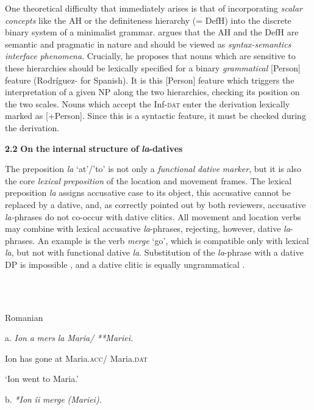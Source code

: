 \documentclass[output=paper,modfonts,nonflat]{langsci/langscibook}
\begin{document}
One theoretical difficulty that immediately arises is that of incorporating \textit{scalar} \textit{concepts} like the AH or the definiteness hierarchy (= DefH) into the discrete binary system of a minimalist grammar. \citet{Richards2008} argues that the AH and the DefH are semantic and pragmatic in nature and should be viewed as \textit{syntax-semantics} \textit{interface} \textit{phenomena}. Crucially, he proposes that nouns which are sensitive to these hierarchies should be lexically specified for a binary \textit{grammatical} [Person] feature (Rodríguez-\citealt{Mondoñedo2007} for Spanish). It is this [Person] feature which triggers the interpretation of a given NP along the two hierarchies, checking its position on the two scales. Nouns which accept the Inf-\textsc{dat} enter the derivation lexically marked as [+Person]. Since this is a syntactic feature, it must be checked during the derivation. 

\textbf{2.2} \textbf{On} \textbf{the} \textbf{internal} \textbf{structure} \textbf{of} \textbf{\textit{la}}\textbf{{}-datives}

The preposition \textit{la} ‘at’/’to’ is not only a \textit{functional} \textit{dative} \textit{marker}, but it is also the core \textit{lexical} \textit{preposition} of the location and movement frames. The lexical preposition \textit{la} assigns accusative case to its object, this accusative cannot be replaced by a dative, and, as correctly pointed out by both reviewers, accusative \textit{la-}phrases do not co-occur with dative clitics. All movement and location verbs may combine with lexical accusative \textit{la}{}-phrases, rejecting, however, dative \textit{la}{}-phrases. An example is the verb \textit{merge} ‘go’, which is compatible only with lexical \textit{la}, but not with functional dative \textit{la}. Substitution of the \textit{la}{}-phrase with a dative DP is impossible , and a dative clitic is equally ungrammatical .

\ea%
    \label{ex:key:9}
    \gll\\
        \\
    \glt
    \z

          Romanian

 a.  \textit{Ion}   \textit{a} \textit{mers}    \textit{la} \textit{Maria/}  \textit{**Mariei.}

    Ion   has gone   at Maria.\textsc{acc}/   Maria.\textsc{dat}

    ‘Ion went to Maria.’

b.  \textit{*Ion}  \textit{îi} \textit{merge}   \textit{(Mariei).}
\end{document}
